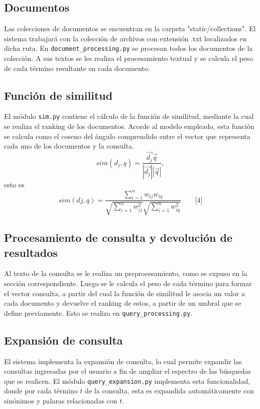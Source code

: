 \documentclass[twoside]{article}
\begin{document}
\subsection{Documentos}
\qquad Las colecciones de documentos se encuentran en la carpeta "static/collections". El sistema trabajar\'a con la colecci\'on de archivos con extensi\'on .txt localizados en dicha ruta. En \texttt{document\_processing.py} se procesan todos los documentos de la colecci\'on. A sus textos se les realiza el procesamiento textual y se calcula el peso de cada t\'ermino resultante en cada documento.

\subsection{Funci\'on de similitud}
\qquad El m\'odulo \texttt{sim.py} contiene el c\'alculo de la funci\'on de similitud, mediante la cual se realiza el ranking de los  documentos. Acorde al modelo empleado, esta funci\'on se calcula como el coseno del \'angulo comprendido entre el vector que representa cada uno de los documentos y la consulta.  $$sim(d_j,q) = \frac{\vec{d_j} \vec{q}}{|\vec{d_j}||\vec{q}|},$$ esto es $$sim(dj, q) = \frac{\sum_{i=1}^n w_{ij} w_{iq}}{\sqrt{\sum_{i=1}^n w_{ij}^2}\sqrt{\sum_{i=1}^n w_{iq}^2}} \qquad \text{[4]}$$

\subsection{Procesamiento de consulta y devoluci\'on de resultados}
\qquad Al texto de la consulta se le realiza un preprocesamiento, como se expuso en la secci\'on correspondiente. Luego se le calcula el peso de cada t\'ermino para formar el vector consulta, a partir del cual la funci\'on de similitud le asocia un valor a cada documento y devuelve el ranking de estos, a partir de un umbral que se define previamente. Esto se realiza en \texttt{query\_processing.py}.

\subsection{Expansi\'on de consulta}
\qquad El sistema implementa la expansi\'on de consulta, lo cual permite expandir las consultas ingresadas por el usuario a fin de ampliar el espectro de las b\'usquedas que se realicen. El m\'odulo \texttt{query\_expansion.py} implementa esta funcionalidad, donde por cada t\'ermino $t$ de la consulta, esta es expandida autom\'aticamente con sin\'onimos y palaras relacionadas con $t$.
\end{document}
